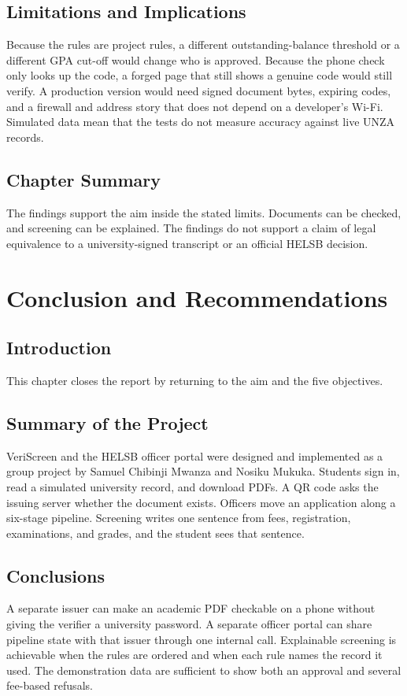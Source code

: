 \documentclass[12pt,a4paper]{report}
\begin{document}
\section{Limitations and Implications}
Because the rules are project rules, a different outstanding-balance threshold or a different GPA cut-off would change who is approved. Because the phone check only looks up the code, a forged page that still shows a genuine code would still verify. A production version would need signed document bytes, expiring codes, and a firewall and address story that does not depend on a developer's Wi-Fi. Simulated data mean that the tests do not measure accuracy against live UNZA records.

\section{Chapter Summary}
The findings support the aim inside the stated limits. Documents can be checked, and screening can be explained. The findings do not support a claim of legal equivalence to a university-signed transcript or an official HELSB decision.

\chapter{Conclusion and Recommendations}

\section{Introduction}
This chapter closes the report by returning to the aim and the five objectives.

\section{Summary of the Project}
VeriScreen and the HELSB officer portal were designed and implemented as a group project by Samuel Chibinji Mwanza and Nosiku Mukuka. Students sign in, read a simulated university record, and download PDFs. A QR code asks the issuing server whether the document exists. Officers move an application along a six-stage pipeline. Screening writes one sentence from fees, registration, examinations, and grades, and the student sees that sentence.

\section{Conclusions}
A separate issuer can make an academic PDF checkable on a phone without giving the verifier a university password. A separate officer portal can share pipeline state with that issuer through one internal call. Explainable screening is achievable when the rules are ordered and when each rule names the record it used. The demonstration data are sufficient to show both an approval and several fee-based refusals.
\end{document}
